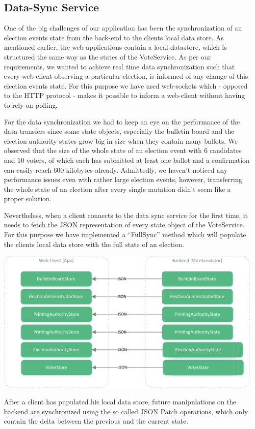\newpage
\subsection{Data-Sync Service}
One of the big challenges of our application has been the synchronization of an election events state from the back-end to the clients local data store. As mentioned earlier, the web-applications contain a local datastore, which is structured the same way as the states of the VoteService. As per our requirements, we wanted to achieve real time data synchronization such that every web client observing a particular election, is informed of any change of this election events state. For this purpose we have used web-sockets which - opposed to the HTTP protocol - makes it possible to inform a web-client without having to rely on polling. 

For the data synchronization we had to keep an eye on the performance of the data transfers since some state objects, especially the bulletin board and the election authority states grow big in size when they contain many ballots. We observed that the size of the whole state of an election event with 6 candidates and 10 voters, of which each has submitted at least one ballot and a confirmation can easily reach 600 kilobytes already. Admittedly, we haven't noticed any performance issues even with rather large election events, however, transferring the whole state of an election after every single mutation didn't seem like a proper solution.

Nevertheless, when a client connects to the data sync service for the first time, it needs to fetch the JSON representation of every state object of the VoteService. For this purpose we have implemented a "`FullSync"' method which will populate the clients local data store with the full state of an election.

\begin{center}
\includegraphics[scale=0.62]{assets/datastores.pdf}
\label{Datastores}%
\end{center}
After a client has pupulated his local data store, future manipulations on the backend are synchronized using the so called JSON Patch operations, which only contain the delta between the previous and the current state.

